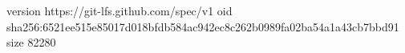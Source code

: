 version https://git-lfs.github.com/spec/v1
oid sha256:6521ee515e85017d018bfdb584ac942ec8c262b0989fa02ba54a1a43cb7bbd91
size 82280

